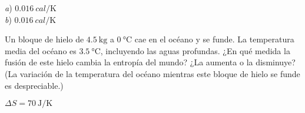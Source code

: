 \begin{Answer}
	\begin{minipage}[t]{.4\textwidth}
    \textit{a}) $\SI{0.016}{cal/\kelvin}$\\ \textit{b}) $\SI{0.016}{cal/\kelvin}$
  \end{minipage}
\end{Answer}
%
\begin{Exercise}
  Un bloque de hielo de $\SI{4.5}{\kilogram}$ a $\SI{0}{\celsius}$ cae en el océano y se funde. La temperatura media del océano es $\SI{3.5}{\celsius}$, incluyendo las aguas profundas. ¿En qué medida la fusión de este hielo cambia la entropía del mundo? ¿La aumenta o la disminuye? (La variación de la temperatura del océano mientras este bloque de hielo se funde es despreciable.)
\end{Exercise}
\begin{Answer}
	\begin{minipage}[t]{.4\textwidth}
    $\Delta S = \SI{70}{\joule/\kelvin}$
  \end{minipage}
\end{Answer}
%
